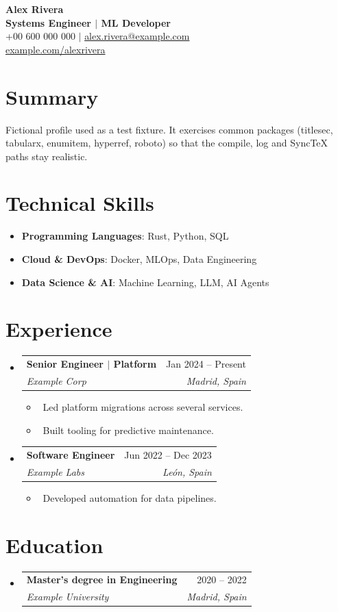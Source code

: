 \documentclass[letterpaper,10pt]{article}
\makeatletter
\newcommand{\resumeItem}[1]{\item\small{#1}}
\newcommand{\resumeSubheading}[4]{
\vspace{-1pt}\item
  \begin{tabular*}{0.97\textwidth}[t]{l@{\extracolsep{\fill}}r}
    \textbf{#1} & #2 \\
    \textit{#3} & \textit{#4} \\
  \end{tabular*}\vspace{-7pt}
}
\newcommand{\resumeSubHeadingList}{\begin{itemize}[leftmargin=0.15in, label={}]}
\newcommand{\resumeSubHeadingListEnd}{\end{itemize}}
\makeatother
\begin{document}
\begin{center}
  \textbf{\Huge Alex Rivera} \\[2pt]
  \small \textbf{Systems Engineer $|$ ML Developer} \\[4pt]
  \small +00 600 000 000 $|$ \href{mailto:alex.rivera@example.com}{alex.rivera@example.com} \\
  \small \href{https://example.com/alexrivera}{example.com/alexrivera}
\end{center}

\section*{Summary}
Fictional profile used as a test fixture. It exercises common packages (titlesec, tabularx,
enumitem, hyperref, roboto) so that the compile, log and SyncTeX paths stay realistic.

\section{Technical Skills}
\resumeSubHeadingList
  \resumeItem{\textbf{Programming Languages}: Rust, Python, SQL}
  \resumeItem{\textbf{Cloud \& DevOps}: Docker, MLOps, Data Engineering}
  \resumeItem{\textbf{Data Science \& AI}: Machine Learning, LLM, AI Agents}
\resumeSubHeadingListEnd

\section{Experience}
\resumeSubHeadingList
  \resumeSubheading
      {Senior Engineer $|$ Platform}{Jan 2024 -- Present}
      {Example Corp}{Madrid, Spain}
      \resumeSubHeadingList
          \resumeItem{\textbullet\ Led platform migrations across several services.}
          \resumeItem{\textbullet\ Built tooling for predictive maintenance.}
      \resumeSubHeadingListEnd
  \resumeSubheading
      {Software Engineer}{Jun 2022 -- Dec 2023}
      {Example Labs}{Le\'on, Spain}
      \resumeSubHeadingList
          \resumeItem{\textbullet\ Developed automation for data pipelines.}
      \resumeSubHeadingListEnd
\resumeSubHeadingListEnd

\section{Education}
\resumeSubHeadingList
  \resumeSubheading
      {Master's degree in Engineering}{2020 -- 2022}
      {Example University}{Madrid, Spain}
\resumeSubHeadingListEnd
\end{document}
